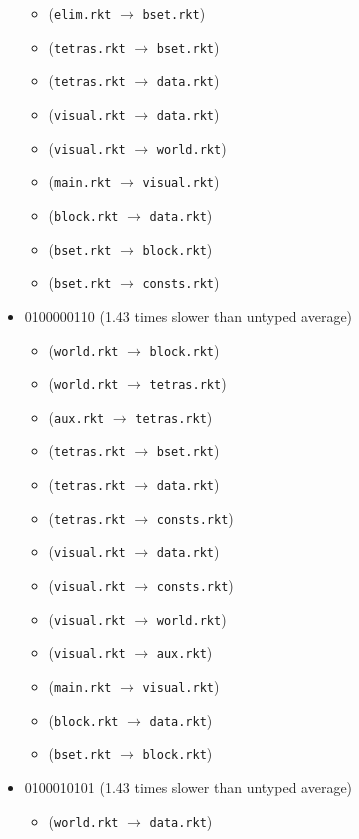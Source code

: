 \documentclass{article}
\newcommand{\mono}[1]{\texttt{#1}}
\begin{document}
\begin{itemize}
\begin{itemize}
  \item (\mono{elim.rkt} $\rightarrow$ \mono{bset.rkt})
  \item (\mono{tetras.rkt} $\rightarrow$ \mono{bset.rkt})
  \item (\mono{tetras.rkt} $\rightarrow$ \mono{data.rkt})
  \item (\mono{visual.rkt} $\rightarrow$ \mono{data.rkt})
  \item (\mono{visual.rkt} $\rightarrow$ \mono{world.rkt})
  \item (\mono{main.rkt} $\rightarrow$ \mono{visual.rkt})
  \item (\mono{block.rkt} $\rightarrow$ \mono{data.rkt})
  \item (\mono{bset.rkt} $\rightarrow$ \mono{block.rkt})
  \item (\mono{bset.rkt} $\rightarrow$ \mono{consts.rkt})
  \end{itemize}
\item 0100000110 (1.43 times slower than untyped average)
  \begin{itemize}
  \item (\mono{world.rkt} $\rightarrow$ \mono{block.rkt})
  \item (\mono{world.rkt} $\rightarrow$ \mono{tetras.rkt})
  \item (\mono{aux.rkt} $\rightarrow$ \mono{tetras.rkt})
  \item (\mono{tetras.rkt} $\rightarrow$ \mono{bset.rkt})
  \item (\mono{tetras.rkt} $\rightarrow$ \mono{data.rkt})
  \item (\mono{tetras.rkt} $\rightarrow$ \mono{consts.rkt})
  \item (\mono{visual.rkt} $\rightarrow$ \mono{data.rkt})
  \item (\mono{visual.rkt} $\rightarrow$ \mono{consts.rkt})
  \item (\mono{visual.rkt} $\rightarrow$ \mono{world.rkt})
  \item (\mono{visual.rkt} $\rightarrow$ \mono{aux.rkt})
  \item (\mono{main.rkt} $\rightarrow$ \mono{visual.rkt})
  \item (\mono{block.rkt} $\rightarrow$ \mono{data.rkt})
  \item (\mono{bset.rkt} $\rightarrow$ \mono{block.rkt})
  \end{itemize}
\item 0100010101 (1.43 times slower than untyped average)
  \begin{itemize}
  \item (\mono{world.rkt} $\rightarrow$ \mono{data.rkt})

\end{itemize}
\end{itemize}
\end{document}
